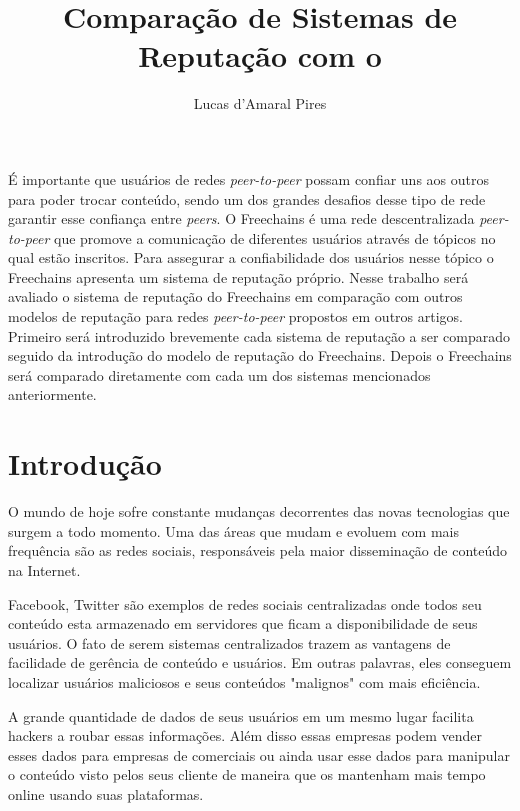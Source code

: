 \documentclass[12pt]{article}
\title{Comparação de Sistemas de Reputação com o \FC}
\author{Lucas d'Amaral Pires\inst{1}}
\newcommand{\FC} {Freechains\xspace}
\newcommand{\PtoP} {\emph{peer-to-peer}\xspace}
\begin{document}
 

\maketitle

\begin{resumo} 

É importante que usuários de redes \PtoP possam confiar uns aos outros para poder trocar conteúdo, sendo um dos grandes desafios desse tipo de rede garantir esse confiança entre \emph{peers}. O \FC é uma rede descentralizada \PtoP que promove a comunicação de diferentes usuários através de tópicos no qual estão inscritos. Para assegurar a confiabilidade dos usuários nesse tópico o \FC apresenta um sistema de reputação próprio. Nesse trabalho será avaliado o sistema de reputação do \FC em comparação com outros modelos de reputação para redes \PtoP propostos em outros artigos. Primeiro será introduzido brevemente cada sistema de reputação a ser comparado seguido da introdução do modelo de reputação do \FC. Depois o \FC será comparado diretamente com cada um dos sistemas mencionados anteriormente.
  
\end{resumo}


\section{Introdução} \label{sec:intro}

O mundo de hoje sofre constante mudanças decorrentes das novas tecnologias que surgem a todo momento. Uma das áreas que mudam e evoluem com mais frequência são as redes sociais, responsáveis pela maior disseminação de conteúdo na Internet.

Facebook, Twitter são exemplos de redes sociais centralizadas onde todos seu conteúdo esta armazenado em servidores que ficam a disponibilidade de seus usuários. O fato de serem sistemas centralizados trazem as vantagens de facilidade de gerência de conteúdo e usuários. Em outras palavras, eles conseguem localizar usuários maliciosos e seus conteúdos "malignos" com mais eficiência.

A grande quantidade de dados de seus usuários em um mesmo lugar facilita hackers a roubar essas informações. Além disso essas empresas podem vender esses dados para empresas de comerciais ou ainda usar esse dados para manipular o conteúdo visto pelos seus cliente de maneira que os mantenham mais tempo online usando suas plataformas.
\end{document}
